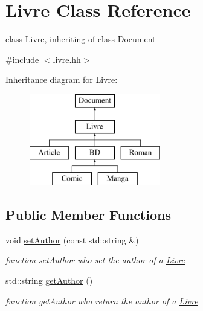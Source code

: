 \hypertarget{classLivre}{
\section{Livre Class Reference}
\label{classLivre}
}


class \hyperlink{classLivre}{Livre}, inheriting of class \hyperlink{classDocument}{Document}  




{\ttfamily \#include $<$livre.hh$>$}

Inheritance diagram for Livre:\begin{figure}[H]
\begin{center}
\leavevmode
\includegraphics[height=4.000000cm]{classLivre}
\end{center}
\end{figure}
\subsection*{Public Member Functions}
\begin{DoxyCompactItemize}
\item 
\hypertarget{classLivre_adeb5fca648e4ee21494782a43a7d805f}{
void \hyperlink{classLivre_adeb5fca648e4ee21494782a43a7d805f}{setAuthor} (const std::string \&)}
\label{classLivre_adeb5fca648e4ee21494782a43a7d805f}

\begin{DoxyCompactList}\small\item\em function setAuthor who set the author of a \hyperlink{classLivre}{Livre} \item\end{DoxyCompactList}\item 
\hypertarget{classLivre_a93f7f7a6824cab47e7595018b66a882d}{
std::string \hyperlink{classLivre_a93f7f7a6824cab47e7595018b66a882d}{getAuthor} ()}
\label{classLivre_a93f7f7a6824cab47e7595018b66a882d}

\begin{DoxyCompactList}\small\item\em function getAuthor who return the author of a \hyperlink{classLivre}{Livre} \item\end{DoxyCompactList}\end{DoxyCompactItemize}
